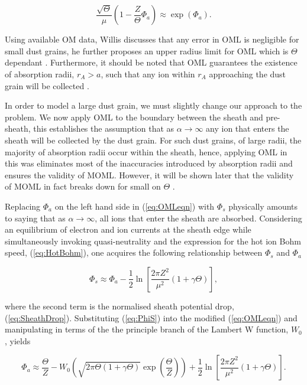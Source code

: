 \documentclass{article}
\begin{document}
\begin{equation}\label{eq:OMLeqn}
\frac{\sqrt{\Theta}}{\mu} \left(1 - \frac{Z}{\Theta}\Phi_a \right) \approx \exp{\left(\Phi_a\right)}.
\end{equation}

\medskip

Using available OM data, Willis discusses that any error in OML is negligible for small dust grains,
he further proposes an upper radius limit for OML which is $\Theta$ dependant \cite{Willis}. Furthermore, it should be noted that
OML guarantees the existence of absorption radii, $r_{A} > a$, such that any 
ion within $r_{A}$ approaching the dust grain will be collected \cite{Thomas}. 

\medskip

In order to model a large dust grain, we must slightly change our approach to the problem.
We now apply OML to the boundary between the sheath and pre-sheath, this establishes
the assumption that as $\alpha \to \infty$ any ion that enters the sheath will be 
collected by the dust grain. For such dust grains, of large radii, the majority of absorption
radii occur within the sheath, hence, applying OML in this was eliminates most of the inaccuracies introduced 
by absorption radii and ensures the validity of MOML. However, it will be shown later that the validity of MOML in fact breaks down for small
on $\Theta$ \cite{Thomas}. 

\medskip

Replacing $\Phi_a$ on the left hand side in (\ref{eq:OMLeqn}) with $\Phi_s$ physically amounts to
saying that as $\alpha \to \infty$, all ions that enter the sheath are absorbed. Considering an equilibrium of
electron and ion currents at the sheath edge while simultaneously invoking quasi-neutrality 
and the expression for the hot ion Bohm speed, (\ref{eq:HotBohm}), one acquires the following 
relationship between $\Phi_s$ and $\Phi_a$

\begin{equation}\label{eq:PhiS}
\Phi_s \approx \Phi_a - \frac{1}{2}\ln{\left[\frac{2\pi Z^2}{\mu^2}(1 + \gamma \Theta)\right]},
\end{equation}

\noindent where the second term is the normalised sheath potential drop, (\ref{eq:SheathDrop}).
Substituting (\ref{eq:PhiS}) into the modified (\ref{eq:OMLeqn}) and manipulating in terms of
the the principle branch of the Lambert W function, $W_0$, yields 

\begin{equation}\label{eq:MOMLsol}
\Phi_a \approx  \frac{\Theta}{Z} - W_{0}\left(\sqrt{2\pi \Theta (1 + \gamma \Theta)} \exp{\left (\frac{\Theta}{Z}\right)}\right) + \frac{1}{2}\ln{\left[\frac{2\pi Z^2}{\mu^2}(1 + \gamma \Theta)\right]}.
\end{equation}
\end{document}
